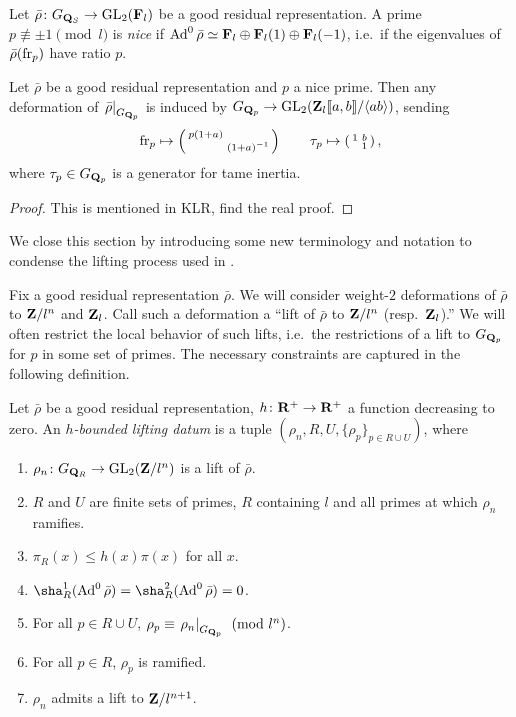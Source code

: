\begin{definition}
Let $\bar\rho\colon G_{\mathbf{Q}_S} \to \operatorname{GL}_2(\mathbf{F}_l)$ be a good residual 
representation. A prime $p\not\equiv \pm 1\pmod l$ is \emph{nice} if 
$\operatorname{Ad}^0\bar\rho\simeq \mathbf{F}_l \oplus \mathbf{F}_l(1)\oplus \mathbf{F}_l(-1)$, i.e.~if the 
eigenvalues of $\bar\rho(\mathrm{fr}_p)$ have ratio $p$. 
\end{definition}

\begin{theorem}
Let $\bar\rho$ be a good residual representation and $p$ a nice prime. Then 
any deformation of $\left.\bar\rho\right|_{G_{\mathbf{Q}_p}}$ is induced by 
$G_{\mathbf{Q}_p} \to \operatorname{GL}_2(\mathbf{Z}_l\llbracket a,b \rrbracket / \langle a b\rangle)$, sending 
\[
	\mathrm{fr}_p \mapsto \left(\begin{smallmatrix} p(1+a) &  \\  & (1+a)^{-1} \end{smallmatrix}\right) \qquad \tau_p \mapsto \left(\begin{smallmatrix} 1 & b \\  & 1 \end{smallmatrix}\right) ,
\]
where $\tau_p\in G_{\mathbf{Q}_p}$ is a generator for tame inertia. 
\end{theorem}
\begin{proof}
This is mentioned in KLR, find the real proof. 
\end{proof}

We close this section by introducing some new terminology and notation to 
condense the lifting process used in \cite{khare-larsen-ramakrishna-2005}. 

Fix a good residual representation $\bar\rho$. We will consider weight-$2$ 
deformations of $\bar\rho$ to $\mathbf{Z}/l^n$ and $\mathbf{Z}_l$. Call such a deformation a 
``lift of $\bar\rho$ to $\mathbf{Z}/l^n$ (resp.~$\mathbf{Z}_l$).'' We will often restrict the 
local behavior of such lifts, i.e.~the restrictions of a lift to $G_{\mathbf{Q}_p}$ 
for $p$ in some set of primes. The necessary constraints are captured in the 
following definition. 

\begin{definition}
Let $\bar\rho$ be a good residual representation, $h\colon \mathbf{R}^+ \to \mathbf{R}^+$ a 
function decreasing to zero. An \emph{$h$-bounded lifting datum} is a tuple 
$(\rho_n,R,U,\{\rho_p\}_{p\in R\cup U})$, where 
\begin{enumerate}
\item
$\rho_n\colon G_{\mathbf{Q}_R} \to \operatorname{GL}_2(\mathbf{Z}/l^n)$ is a lift of $\bar\rho$.

\item
$R$ and $U$ are finite sets of primes, $R$ containing $l$ and all primes at 
which $\rho_n$ ramifies. 

\item
$\pi_R(x)\leqslant h(x)\pi(x)$ for all $x$. 

\item
$\sha_R^1(\Ad^0\bar\rho) = \sha_R^2(\Ad^0\bar\rho) = 0$. 

\item
For all $p\in R\cup U$, 
$\rho_p\equiv \left. \rho_n\right|_{G_{\mathbf{Q}_p}}\pmod{l^n}$. 

\item
For all $p\in R$, $\rho_p$ is ramified. 

\item
$\rho_n$ admits a lift to $\mathbf{Z}/l^{n+1}$. 
\end{enumerate}
\end{definition}

